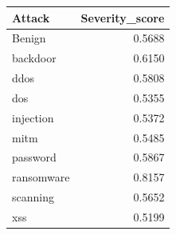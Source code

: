 \begin{tabular}{lr}
\toprule
Attack & Severity_score \\
\midrule
Benign & 0.5688 \\
backdoor & 0.6150 \\
ddos & 0.5808 \\
dos & 0.5355 \\
injection & 0.5372 \\
mitm & 0.5485 \\
password & 0.5867 \\
ransomware & 0.8157 \\
scanning & 0.5652 \\
xss & 0.5199 \\
\bottomrule
\end{tabular}
